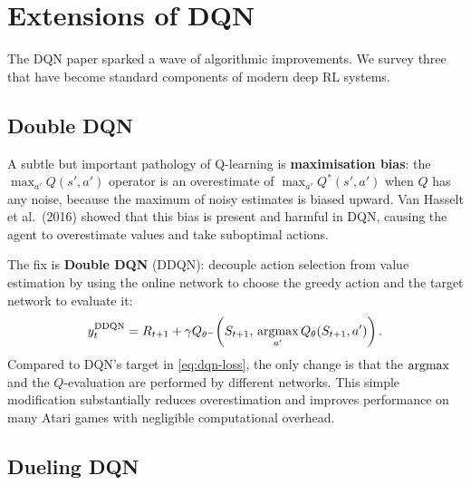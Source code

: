 \section{Extensions of DQN}
\label{sec:dqn-extensions}

The DQN paper sparked a wave of algorithmic improvements.  We survey three that have become
standard components of modern deep RL systems.

\subsection{Double DQN}
\label{subsec:double-dqn}

A subtle but important pathology of Q-learning is \textbf{maximisation
bias}: the $\max_{a'} Q(s', a')$ operator is an overestimate of
$\max_{a'} Q^*(s', a')$ when $Q$ has any noise, because the maximum of noisy estimates is biased
upward.  Van Hasselt et al.~(2016) showed that this bias is present and harmful in DQN, causing
the agent to overestimate values and take suboptimal actions.

The fix is \textbf{Double DQN} (DDQN): decouple action selection from value
estimation by using the online network to choose the greedy action and the target network to
evaluate it:
\begin{equation}
\label{eq:ddqn-target}
y_t^{\mathrm{DDQN}} = R_{t+1} + \gamma Q_{\theta^-}\!\left(S_{t+1},\, \operatorname*{argmax}_{a'} Q_\theta(S_{t+1}, a')\right).
\end{equation}
Compared to DQN's target in \eqref{eq:dqn-loss}, the only change is that the $\operatorname*{argmax}$ and the
$Q$-evaluation are performed by different networks.  This simple modification substantially reduces
overestimation and improves performance on many Atari games with negligible computational overhead.

\subsection{Dueling DQN}
\label{subsec:dueling-dqn}

